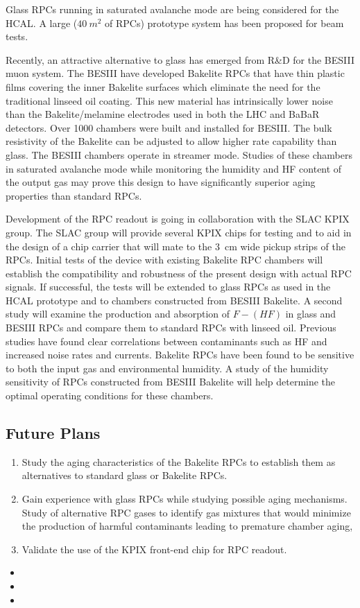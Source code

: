 Glass RPCs running in saturated avalanche mode are being considered for the HCAL. A large ($\SI{40}{m^2}$ of RPCs) prototype system has been proposed
for beam tests.

Recently, an attractive alternative to glass has emerged from R\&D for the BESIII muon system. The BESIII have developed Bakelite RPCs that have thin plastic films covering the inner Bakelite surfaces which eliminate the need for the traditional linseed oil coating. This new material has intrinsically lower noise than the Bakelite/melamine electrodes used in both the LHC and BaBaR detectors. Over 1000 chambers were built and installed for BESIII. The bulk resistivity of the Bakelite can be adjusted to allow higher rate capability than glass. The BESIII chambers operate in streamer mode. Studies of these chambers in saturated avalanche mode while monitoring the humidity and HF content of the output gas may prove this design to have significantly superior aging properties than standard RPCs.

Development of the RPC readout is going in collaboration with the SLAC KPIX group. The SLAC group will provide several KPIX chips for testing and to aid in the design of a chip carrier that will mate to the \SI{3}{cm} wide pickup strips of the RPCs. Initial tests of the device with existing Bakelite RPC chambers will establish the compatibility and robustness of the present design with actual RPC signals. If successful, the tests will be extended to glass RPCs as used in the HCAL prototype and to chambers constructed from BESIII Bakelite.
A second study will examine the production and absorption of $F-(HF)$ in glass and BESIII RPCs and compare them to standard RPCs with linseed oil. Previous studies have found clear correlations between contaminants such as HF and increased noise rates and currents. Bakelite RPCs have been found to be sensitive to both the input gas and environmental humidity. A study of the humidity sensitivity of RPCs constructed from BESIII Bakelite will help determine the optimal operating conditions for these chambers.

\subsection{Future Plans}
\begin{enumerate}
\item Study the aging characteristics of the Bakelite RPCs to establish them as alternatives to standard glass or Bakelite RPCs.
\item Gain experience with glass RPCs while studying possible aging mechanisms. Study of alternative RPC gases to identify gas mixtures that would minimize the production of harmful contaminants leading to premature chamber aging,
\item Validate the use of the KPIX front-end chip for RPC readout.
\end{enumerate}

\begin{itemize}
	\item {}
	\item {}
	\item {}
\end{itemize}
